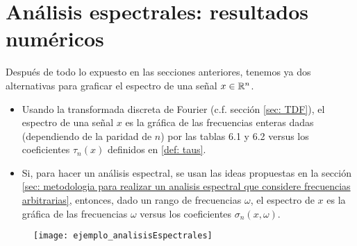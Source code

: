\chapter{Análisis espectrales: resultados numéricos}
\label{chap: resultados numericos analisis espectrales}

Después de todo lo expuesto en las secciones anteriores, tenemos
ya dos alternativas para graficar el espectro
de una señal $x \in \mathbb{R}^{n}$.

\begin{itemize}
	\item Usando la transformada discreta de Fourier
	(c.f. sección \ref{sec: TDF}), el espectro de
	una señal $x$ es la gráfica de las frecuencias
	enteras dadas (dependiendo de la 
	paridad de $n$) por las
	tablas 6.1 y 6.2
	versus los coeficientes
	$\tau_{n}(x)$ definidos en
	\ref{def: taus}.
	
	\item Si, para hacer un análisis espectral, se usan
	las ideas propuestas en 
	la sección
	\ref{sec: metodologia para realizar un analisis espectral que considere frecuencias arbitrarias}, entonces, dado un rango de frecuencias 
	$\omega$,
	el espectro de $x$ es la gráfica de 
	las frecuencias $\omega$ versus	
	los coeficientes
	$\sigma_{n}(x, \omega)$.
	

\end{itemize}


\begin{figure}[H]
	\centering
	\texttt{[image: ejemplo\_analisisEspectrales]} 
\end{figure}	